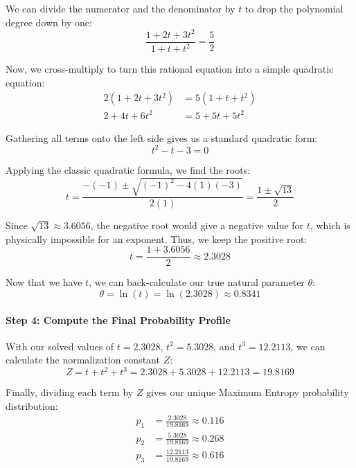 \documentclass{article}
\begin{document}
We can divide the numerator and the denominator by $t$ to drop the polynomial degree down by one:
\begin{equation}
\frac{1 + 2t + 3t^2}{1 + t + t^2} = \frac{5}{2} \tag{103}
\end{equation}

Now, we cross-multiply to turn this rational equation into a simple quadratic equation:
\begin{align}
2(1 + 2t + 3t^2) &= 5(1 + t + t^2) \nonumber \\
2 + 4t + 6t^2 &= 5 + 5t + 5t^2 \tag{104}
\end{align}

Gathering all terms onto the left side gives us a standard quadratic form:
\begin{equation}
t^2 - t - 3 = 0 \tag{105}
\end{equation}

Applying the classic quadratic formula, we find the roots:
\begin{equation}
t = \frac{-(-1) \pm \sqrt{(-1)^2 - 4(1)(-3)}}{2(1)} = \frac{1 \pm \sqrt{13}}{2} \tag{106}
\end{equation}

Since $\sqrt{13} \approx 3.6056$, the negative root would give a negative value for $t$, which is physically impossible for an exponent. Thus, we keep the positive root:
\begin{equation}
t = \frac{1 + 3.6056}{2} \approx 2.3028 \tag{107}
\end{equation}

Now that we have $t$, we can back-calculate our true natural parameter $\theta$:
\begin{equation}
\theta = \ln(t) = \ln(2.3028) \approx 0.8341 \tag{108}
\end{equation}

\paragraph{Step 4: Compute the Final Probability Profile}
With our solved values of $t = 2.3028$, $t^2 = 5.3028$, and $t^3 = 12.2113$, we can calculate the normalization constant $Z$:
\begin{equation}
Z = t + t^2 + t^3 = 2.3028 + 5.3028 + 12.2113 = 19.8169 \tag{109}
\end{equation}

Finally, dividing each term by $Z$ gives our unique Maximum Entropy probability distribution:
\begin{align}
p_1 &= \frac{2.3028}{19.8169} \approx \mathbf{0.116} \tag{110} \\
p_2 &= \frac{5.3028}{19.8169} \approx \mathbf{0.268} \tag{111} \\
p_3 &= \frac{12.2113}{19.8169} \approx \mathbf{0.616} \tag{112}
\end{align}
\end{document}
